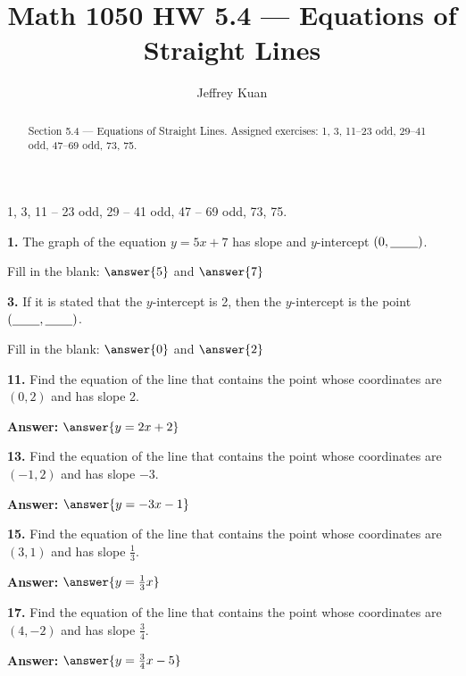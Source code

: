 \documentclass{ximera}
\author{Jeffrey Kuan}
\title{Math 1050 HW 5.4 --- Equations of Straight Lines}
\begin{document}
\begin{abstract}
    Section 5.4 --- Equations of Straight Lines.
    Assigned exercises: 1, 3, 11–23 odd, 29–41 odd, 47–69 odd, 73, 75.
\end{abstract}

\maketitle

1, 3, 11 – 23 odd, 29 – 41 odd, 47 – 69 odd, 73, 75.

\begin{problem}
\textbf{1.} The graph of the equation $y = 5x + 7$ has slope \blank{} and $y$-intercept
  $(0, \underline{\hspace{2.2em}})$.

Fill in the blank: $\answer{5}$ and $\answer{7}$
\end{problem}

\begin{problem}
\textbf{3.} If it is stated that the $y$-intercept is 2, then the $y$-intercept is the point
  $(\underline{\hspace{2.2em}}, \underline{\hspace{2.2em}})$.

Fill in the blank: $\answer{0}$ and  $\answer{2}$
\end{problem}

\begin{problem}
\textbf{11.} Find the equation of the line that contains the point whose coordinates are
  $(0, 2)$ and has slope 2.

\textbf{Answer:} $\answer{y = 2x +2}$
\end{problem}

\begin{problem}
\textbf{13.} Find the equation of the line that contains the point whose coordinates are
  $(-1, 2)$ and has slope $-3$.

\textbf{Answer:} $\answer{y = -3x -1}$
\end{problem}

\begin{problem}
\textbf{15.} Find the equation of the line that contains the point whose coordinates are
  $(3, 1)$ and has slope $\frac{1}{3}$.

\textbf{Answer:} $\answer{y = \frac{1}{3}x}$
\end{problem}

\begin{problem}
\textbf{17.} Find the equation of the line that contains the point whose coordinates are
  $(4, -2)$ and has slope $\frac{3}{4}$.

\textbf{Answer:} $\answer{y = \frac{3}{4}x -5}$
\end{problem}
\end{document}
